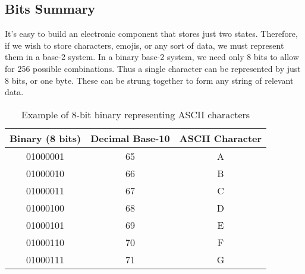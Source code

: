 \documentclass[12pt]{article}
\begin{document}
\subsection*{Bits Summary}

It's easy to build an electronic component that stores just two states. Therefore, if we wish to store characters, emojis, or any sort of data, we must represent them in a base-2 system. In a binary base-2 system, we need only 8 bits to allow for 256 possible combinations. Thus a single character can be represented by just 8 bits, or one byte. These can be strung together to form any string of relevant data.

\begin{table}[h!]
\centering
\begin{tabular}{|c|c|c|}
\hline
\textbf{Binary (8 bits)} & \textbf{Decimal Base-10} & \textbf{ASCII Character} \\
\hline
01000001 & 65  & A \\
01000010 & 66  & B \\
01000011 & 67  & C \\
01000100 & 68  & D \\
01000101 & 69  & E \\
01000110 & 70  & F \\
01000111 & 71  & G \\
\hline
\end{tabular}
\caption{Example of 8-bit binary representing ASCII characters}
\end{table}
\end{document}
